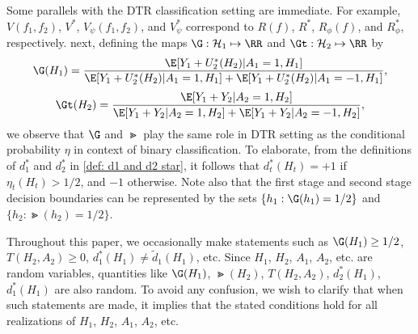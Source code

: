 \documentclass[preprint] {imsart}
\begin{document}
 Some parallels with the DTR classification setting are immediate. For example,   $V(f_1, f_2)$, $V^*$, $V_{\psi}(f_1, f_2)$, and $V^*_{\psi}$ correspond to $R(f)$, $R^*$, $R_{\phi}(f)$,  and $R^*_{\phi}$,  respectively. next, defining the maps $\G:\mathcal H_1\mapsto \RR$ and {\color{black} $\Gt:\mathcal H_2\mapsto\RR$ } by
  \begin{equation}\label{def: G}
     \G(H_1)=\frac{\E[Y_1+U_2^*(H_2)|A_1=1, H_1]}{\E[Y_1+U_2^*(H_2)|A_1=1, H_1]+\E[Y_1+U_2^*(H_2)|A_1=-1, H_1]},
 \end{equation}
\begin{equation}\label{def: Gt}
    \Gt(H_2)=\frac{\E[Y_1+Y_2|A_2=1,H_2]}{\E[Y_1+Y_2|A_2=1,H_2] +\E[Y_1+Y_2| A_2=-1,H_2]},
 \end{equation}
 we observe that
 $\G$ and $\Gt$ play the same role in DTR setting as the conditional probability  $\eta$ in context of binary  classification. To elaborate, from the definitions of $d_1^*$ and $d_2^*$ in \eqref{def: d1 and d2 star}, it follows that $d_t^*(H_t)=+1$ if $\eta_{t}(H_t)>1/2$, and $-1$ otherwise.
 Note also that  the first stage and second stage decision boundaries can be represented by the sets $\{h_1:\G(h_1)=1/2\}$ and $\{h_2:\Gt(h_2)=1/2\}$.

Throughout this paper, we occasionally make statements such as $\G(H_1)\geq 1/2$, $T(H_2,A_2)\geq 0$, $d_1^*(H_1)\neq \tilde d_1(H_1)$, etc. Since $H_1$, $H_2$, $A_1$, $A_2$, etc. are random variables, quantities like $\G(H_1)$, $\Gt(H_2)$, $T(H_2,A_2)$, $d_2^*(H_1)$, $d_1^*(H_1)$ are also random. To avoid any confusion, we wish to clarify that when such statements are made, it implies that the stated conditions hold for all realizations of $H_1$, $H_2$, $A_1$, $A_2$, etc.

\end{document}
